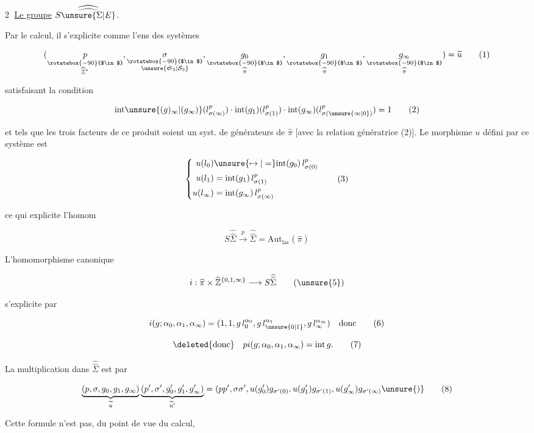 
\textcircled{2} \uline{Le groupe} $S\widehat{\widehat{\unsure{\Sigma|E}}}$.

Par le calcul, il s'explicite comme l'ens des systèmes

\[
(\underset{\substack{\rotatebox{-90}{$\in$}\\\widehat{\mathbb Z}^{*}}}{p},
 \underset{\substack{\rotatebox{-90}{$\in$}\\\unsure{\mathfrak S_3|\mathcal S_3}}}{\sigma},
 \underset{\substack{\rotatebox{-90}{$\in$}\\\widehat\pi}}{g_0},
 \underset{\substack{\rotatebox{-90}{$\in$}\\\widehat\pi}}{g_1},
 \underset{\substack{\rotatebox{-90}{$\in$}\\\widehat\pi}}{g_\infty})=\widetilde u \tag*{(1)}
\]

satisfaisant la condition

\[
\mathrm{int}\unsure{(g)_{\infty}|(g_{\infty})}(l_{\sigma(\infty)}^p)\cdot
\mathrm{int}(g_1)(l_{\sigma(1)}^p)\cdot
\mathrm{int}(g_\infty)(l_{\sigma(\unsure{\infty|0})}^p)=1 \tag*{(2)}
\]

et tels que les trois facteurs de ce produit soient un syst. de générateurs de $\widehat\pi$ [avec la relation génératrice (2)]. Le morphisme $u$ défini par ce  système est

\[
\left\{\begin{aligned}
u(l_0)&\unsure{\mapsto|=}\mathrm{int}(g_0)\,l_{\sigma(0)}^p\\
u(l_1)&=\mathrm{int}(g_1)\,l_{\sigma(1)}^p\\
u(l_\infty)&=\mathrm{int}(g_\infty)\,l_{\sigma(\infty)}^p
\end{aligned}\right. \tag*{(3)}
\]

ce qui explicite l'homom

\[
S\widehat{\widehat\Sigma}\xrightarrow{p}\widehat{\widehat\Sigma}=\mathrm{Aut}_{\mathrm{lac}}(\widehat\pi) \tag*{(4)}
\]

L'homomorphisme canonique

\[
i:\widehat\pi\times\widehat{\mathbb Z}^{\{0,1,\infty\}}\longrightarrow S\widehat{\widehat\Sigma} \tag*{(\unsure{5})}
\]

s'explicite par


\[
i(g;\alpha_0,\alpha_1,\alpha_\infty)=(1,1,g\,l_0^{\alpha_0},g\,l_{\unsure{0|1}}^{\alpha_1},g\,l_\infty^{\alpha_\infty})\quad\text{donc} \tag*{(6)}
\]

\[
\deleted{\text{donc}}\quad pi(g;\alpha_0,\alpha_1,\alpha_\infty)=\mathrm{int}\,g. \tag*{(7)}
\]

La multiplication dans $\widehat{\widehat\Sigma}$ est  par

\[
\underbrace{(p,\sigma,g_0,g_1,g_\infty)}_{\widetilde u}
\underbrace{(p',\sigma',g'_0,g'_1,g'_\infty)}_{\widetilde u'}
=(pp',\sigma\sigma',u(g'_0)g_{\sigma'(0)},u(g'_1)g_{\sigma'(1)},u(g'_\infty)g_{\sigma'(\infty)}\unsure{)} \tag*{(8)}
\]

Cette formule n'est pas, du point de vue du calcul,
